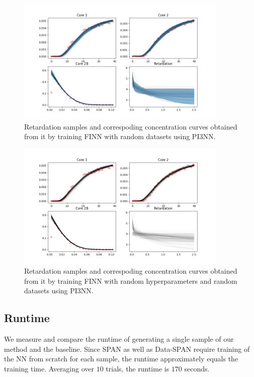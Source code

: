 \documentclass{article}
\begin{document}
\begin{figure}
    \centering
    \includegraphics[width=0.9\textwidth]{figs/finn_dataspan_samples.png}
    \caption{Retardation samples and correspoding concentration curves obtained from it by training FINN with random datasets using PI3NN.}
    \label{fig:dataspan_samples}
\end{figure}

\begin{figure}
    \centering
    \includegraphics[width=0.9\textwidth]{figs/finn_fullspan_samples.png}
    \caption{Retardation samples and correspoding concentration curves obtained from it by training FINN with random hyperparameters and random datasets using PI3NN.}
    \label{fig:fullspan_samples}
\end{figure}




\subsection{Runtime}
We measure and compare the runtime of generating a single sample of our method and the baseline. Since SPAN as well as Data-SPAN require training of the NN from scratch for each sample, the runtime approximately equals the training time. Averaging over $10$ trials, the runtime is $170$ seconds.
\end{document}
